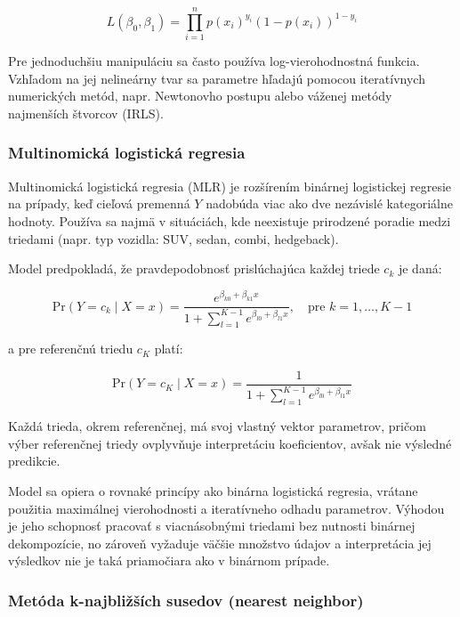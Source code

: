 \begin{equation}
L(\beta_0, \beta_1) = \prod_{i=1}^{n} p(x_i)^{y_i} (1 - p(x_i))^{1 - y_i}
\end{equation}

Pre jednoduchšiu manipuláciu sa často používa log-vierohodnostná funkcia. Vzhľadom na jej nelineárny tvar sa parametre hľadajú pomocou iteratívnych numerických metód, napr. Newtonovho postupu alebo váženej metódy najmenších štvorcov (IRLS).

\subsubsection{Multinomická logistická regresia}
\label{subsubsec:multinom_log_reg}

Multinomická logistická regresia (MLR) je rozšírením binárnej logistickej regresie na prípady, keď cieľová premenná $Y$ nadobúda viac ako dve nezávislé kategoriálne hodnoty. Používa sa najmä v situáciách, kde neexistuje prirodzené poradie medzi triedami (napr. typ vozidla: SUV, sedan, combi, hedgeback).

Model predpokladá, že pravdepodobnosť prislúchajúca každej triede $c_k$ je daná:

\begin{equation}
\mathrm{Pr}(Y = c_k \mid X = x) = \frac{e^{\beta_{k0} + \beta_{k1} x}}{1 + \sum\limits_{l=1}^{K-1} e^{\beta_{l0} + \beta_{l1} x}}, \quad \text{pre } k = 1, \dots, K-1
\end{equation}

a pre referenčnú triedu $c_K$ platí:

\begin{equation}
\mathrm{Pr}(Y = c_K \mid X = x) = \frac{1}{1 + \sum\limits_{l=1}^{K-1} e^{\beta_{l0} + \beta_{l1} x}}
\end{equation}

Každá trieda, okrem referenčnej, má svoj vlastný vektor parametrov, pričom výber referenčnej triedy ovplyvňuje interpretáciu koeficientov, avšak nie výsledné predikcie.

Model sa opiera o rovnaké princípy ako binárna logistická regresia, vrátane použitia maximálnej vierohodnosti a iteratívneho odhadu parametrov. Výhodou je jeho schopnosť pracovať s viacnásobnými triedami bez nutnosti binárnej dekompozície, no zároveň vyžaduje väčšie množstvo údajov a interpretácia jej výsledkov nie je taká priamočiara ako v binárnom prípade.

\subsubsection{Metóda k-najbližších susedov (nearest neighbor)}
\label{subsubsec:knn}

